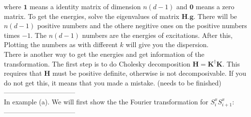 \documentclass[letter]{article}
\begin{document}
where $\mathbf{1}$ means a identity matrix of dimension $n(d-1)$ and $\mathbf{0}$ means a zero matrix. To get the energies, solve the eigenvalues of matrix $\mathbf{H}.\mathbf{g}$. There will be $n(d-1)$ positive numbers and the othere negitive ones on the positive numbers times $-1$. The $n(d-1)$ numbers are the energies of excitations. After this, Plotting the numbers as with different $k$ will give you the dispersion.\\
There is another way to get the energies and get information of the transformation. The first step is to do Cholesky decomposition $\mathbf{H}=\mathbf{K}^{\dagger}\mathbf{K}$. This requires that $\mathbf{H}$ must be positive definite, otherwise is not decomposivable. If you do not get this, it means that you made a mistake. (needs to be finished) \\
--------------------------------\\
In example (a). We will first show the the Fourier transformation for $S_i^x S_{i+1}^x$:\\
--------------------------------\\
\end{document}
